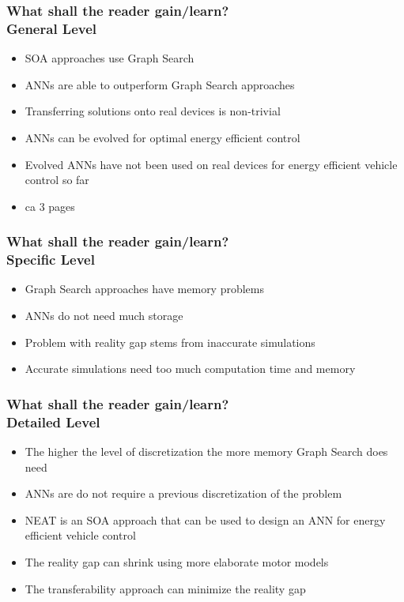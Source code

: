\documentclass[8pt]{beamer}
\begin{document}
\begin{frame}
\frametitle{What shall the reader gain/learn?\\General Level}
\begin{itemize}
	\item SOA approaches use Graph Search 
	\item ANNs are able to outperform Graph Search approaches
	\item Transferring solutions onto real devices is non-trivial
	\item ANNs can be evolved for optimal energy efficient control
	\item Evolved ANNs have not been used on real devices for energy efficient vehicle control so far
	\item ca 3 pages
\end{itemize}
\end{frame}

\begin{frame}
\frametitle{What shall the reader gain/learn?\\Specific Level}
\begin{itemize}
	\item Graph Search approaches have memory problems
	\item ANNs do not need much storage
	\item Problem with reality gap stems from inaccurate simulations
	\item Accurate simulations need too much computation time and memory
\end{itemize}
\end{frame}

\begin{frame}
\frametitle{What shall the reader gain/learn?\\Detailed Level}
\begin{itemize}
	\item The higher the level of discretization the more memory Graph Search does need
	\item ANNs are do not require a previous discretization of the problem
	\item NEAT is an SOA approach that can be used to design an ANN for energy efficient vehicle control
	\item The reality gap can shrink using more elaborate motor models
	\item The transferability approach can minimize the reality gap
\end{itemize}
\end{frame}
\end{document}
